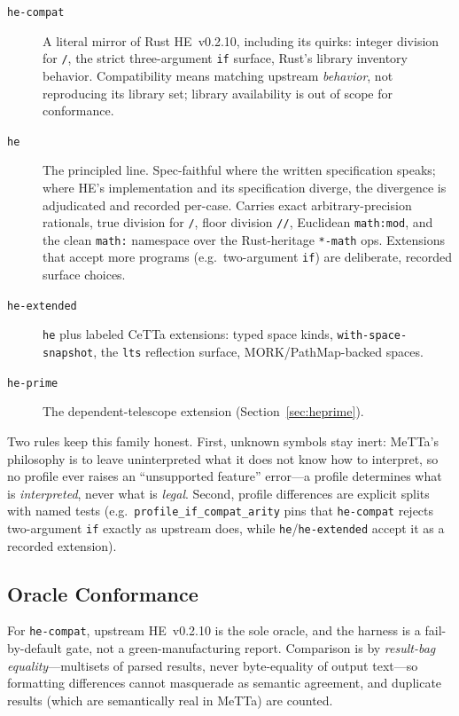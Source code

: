 \documentclass[11pt]{article}
\newcommand{\code}[1]{\texttt{#1}}
\newcommand{\HE}{\textup{HE}}
\newcommand{\CeTTa}{\textup{CeTTa}}
\begin{document}
\begin{description}
\item[\code{he-compat}] A literal mirror of Rust \HE{}~v0.2.10,
  including its quirks: integer division for \code{/}, the strict
  three-argument \code{if} surface, Rust's library inventory behavior.
  Compatibility means matching upstream \emph{behavior}, not
  reproducing its library set; library availability is out of scope
  for conformance.
\item[\code{he}] The principled line.  Spec-faithful where the written
  specification speaks; where \HE{}'s implementation and its
  specification diverge, the divergence is adjudicated and recorded
  per-case.  Carries exact arbitrary-precision rationals, true
  division for \code{/}, floor division \code{//}, Euclidean
  \code{math:mod}, and the clean \code{math:} namespace over the
  Rust-heritage \code{*-math} ops.  Extensions that accept more
  programs (e.g.\ two-argument \code{if}) are deliberate, recorded
  surface choices.
\item[\code{he-extended}] \code{he} plus labeled \CeTTa{} extensions:
  typed space kinds, \code{with-space-snapshot}, the \code{lts}
  reflection surface, MORK/PathMap-backed spaces.
\item[\code{he-prime}] The dependent-telescope extension
  (Section~\ref{sec:heprime}).
\end{description}

Two rules keep this family honest.  First, unknown symbols stay
inert: MeTTa's philosophy is to leave uninterpreted what it does not
know how to interpret, so no profile ever raises an ``unsupported
feature'' error---a profile determines what is \emph{interpreted},
never what is \emph{legal}.  Second, profile differences are explicit
splits with named tests (e.g.\ \code{profile\_if\_compat\_arity}
pins that \code{he-compat} rejects two-argument \code{if} exactly as
upstream does, while \code{he}/\code{he-extended} accept it as a
recorded extension).

\subsection{Oracle Conformance}
\label{sec:conformance}

For \code{he-compat}, upstream \HE{}~v0.2.10 is the sole oracle, and
the harness is a fail-by-default gate, not a green-manufacturing
report.  Comparison is by \emph{result-bag equality}---multisets of
parsed results, never byte-equality of output text---so formatting
differences cannot masquerade as semantic agreement, and duplicate
results (which are semantically real in MeTTa) are counted.
\end{document}
